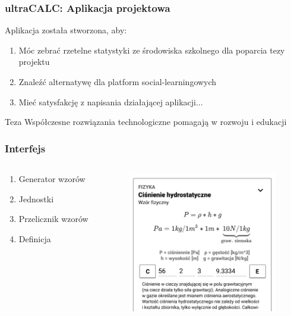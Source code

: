 \documentclass[10pt]{beamer}
\begin{document}
\begin{frame}
  \frametitle{ultraCALC: Aplikacja projektowa}
  Aplikacja została stworzona, aby:
  \begin{enumerate}
    \item Móc zebrać rzetelne statystyki ze środowiska szkolnego dla poparcia tezy projektu
    \item Znaleźć alternatywę dla platform social-learningowych
    \item Mieć satysfakcję z napisania działającej aplikacji...
  \end{enumerate}
  \begin{block}{Teza}
    Współczesne rozwiązania technologiczne pomagają w rozwoju i edukacji
  \end{block}
\end{frame}

\begin{frame}
  \frametitle{Interfejs}
  \begin{columns}
  \begin{column}{0.4\textwidth}
     \begin{enumerate}
       \item Generator wzorów
       \item Jednostki
       \item Przelicznik wzorów
       \item Definicja
     \end{enumerate}
  \end{column}
  \begin{column}{0.6\textwidth}  %
    \begin{figure}[p]
      \includegraphics[width=6.5cm]{screenshot}
    \end{figure}
  \end{column}
  \end{columns}
\end{frame}
\end{document}
